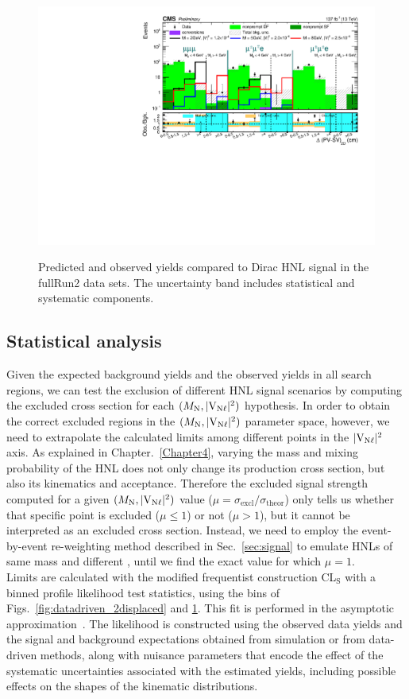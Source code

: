 \begin{figure}[h]
   \includegraphics[width=.51\textwidth]{Figures/c6/results/_final/dirac/M-2_V-0p011225_mu_Dirac_muo_datacard_combined_SR}\\
    \caption{Predicted and observed yields 
    compared to Dirac HNL signal 
    in the fullRun2 data sets.
    The uncertainty band includes
    statistical and systematic components.}
  \label{fig:datadriven_2displaced_dirac}
\end{figure}
\clearpage
\subsection{Statistical analysis}
Given the expected background yields and the observed yields in all
search regions, we can test the exclusion of different HNL signal 
scenarios by computing the excluded cross section
for each $(M_{\mathrm{N}},\mathrm{|V_{\mathrm{N}\ell}|^2})$ hypothesis.
In order to obtain the correct excluded regions in the
$(M_{\mathrm{N}},\mathrm{|V_{\mathrm{N}\ell}|^2})$ parameter space, however, we need to extrapolate the
calculated limits among different points in the
$\mathrm{|V_{\mathrm{N}\ell}|^2}$ axis.
As explained in Chapter.~\ref{Chapter4}, varying the mass and mixing
probability of the HNL does not only change its production cross
section, but also its kinematics and acceptance.
Therefore the excluded signal strength computed for a given
$(M_{\mathrm{N}},\mathrm{|V_{\mathrm{N}\ell}|^2})$ value
($\mu=\sigma_{\mathrm{excl}}/\sigma_{\mathrm{theor}}$) only tells us
whether that specific point is excluded ($\mu\leq 1$) or not
($\mu>1$), but it cannot be interpreted as an excluded cross section.
Instead, we need to employ the event-by-event re-weighting method
described in Sec.~\ref{sec:signal} to emulate HNLs of same mass and
different \mixpar, until we find the exact \mixpar value for which
$\mu=1$.\\

Limits are calculated with the modified frequentist construction
CL$_{\mathrm{S}}$ with a binned profile likelihood
test statistics, using the bins of Figs.~\ref{fig:datadriven_2displaced} and \ref{fig:datadriven_2displaced_dirac}.
This fit is performed in the asymptotic approximation~\cite{cowan}.
The likelihood is constructed using the observed data yields and the
signal and background expectations obtained from simulation or from
data-driven methods, along with nuisance parameters that encode the
effect of the systematic uncertainties associated with the estimated
yields, including possible effects on the shapes of the kinematic
distributions.

